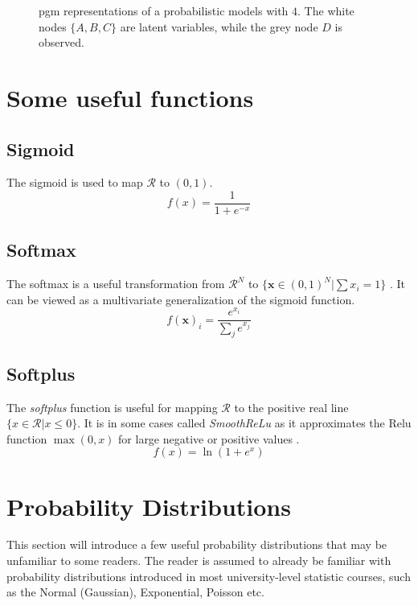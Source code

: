 \begin{figure}[h]
\caption{\acrshort{pgm} representations of a probabilistic models with $4$. The white nodes $\{A, B, C\}$ are latent variables, while the grey node $D$ is observed.}
\end{figure}


\section{Some useful functions}
\subsection{Sigmoid}
The sigmoid is used to map $\mathcal{R}$ to $(0, 1)$.
\begin{equation}\label{eq:sigmoid}
    f(x) = \frac{1}{1 + e^{-x}}
\end{equation}

\subsection{Softmax}
The softmax is a useful transformation from $\mathcal{R}^N$ to $\{\mathbf{x} \in (0,1)^N | \sum x_i = 1\}$ \cite{murphy,tensorflow2015-whitepaper}. It can be viewed as a multivariate generalization of the sigmoid function. 
\begin{equation}\label{eq:softmax}
    f(\mathbf{x})_i = \frac{e^{x_i}}{\sum_j e^{x_j}}
\end{equation}

\subsection{Softplus}
The \textit{softplus} function is useful for mapping $\mathcal{R}$ to the positive real line $\{x \in \mathcal{R} | x \leq 0\}$. It is in some cases called \textit{SmoothReLu} as it approximates the Relu function $\max(0, x)$ for large negative or positive values \cite{tensorflow2015-whitepaper}.
\begin{equation}\label{eq:softplus}
    f(x) = \ln (1 + e^x)
\end{equation}


\section{Probability Distributions}

This section will introduce a few useful probability distributions that may be unfamiliar to some readers. The reader is assumed to already be familiar with probability distributions introduced in most university-level statistic courses, such as the Normal (Gaussian), Exponential, Poisson etc. 

